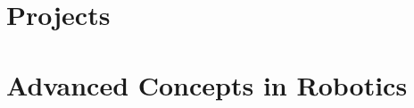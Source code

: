 \documentclass[11pt,a4paper]{report}
\begin{document}


\part{Projects}






\part{Advanced Concepts in Robotics}




\end{document}
